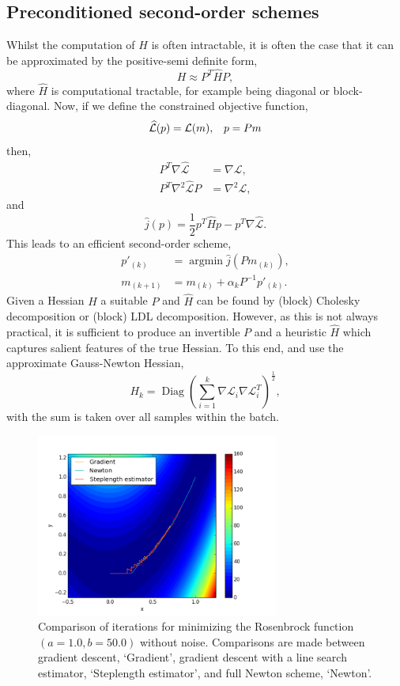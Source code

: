\documentclass[11pt,twocolumn]{article}
\DeclareMathOperator*{\Diag}{Diag}
\DeclareMathOperator*{\argmin}{argmin}
\begin{document}
\subsection{Preconditioned second-order schemes}
Whilst the computation of $H$ is often intractable, it is often the case that it can be approximated by the positive-semi definite form,
\begin{equation}
H \approx P^T \widehat{H} P,
\end{equation}
where $\widehat{H}$ is computational tractable, for example being diagonal or block-diagonal.  Now, if we define the constrained objective function,
\begin{equation}
\widehat{\mathcal{L}}(p)=\mathcal{L}(m), \hspace{0,3cm} p=Pm
\end{equation}
then,
\begin{align}
P^T \nabla \widehat{\mathcal{L}}&=\nabla \mathcal{L},\\
P^T \nabla^2 \widehat{\mathcal{L}} P&=\nabla^2 \mathcal{L},
\end{align}
and
\begin{equation}
\widehat{j}(p)=\frac{1}{2}p^T \widehat{H} p-p^T\nabla\widehat{\mathcal{L}}.
\end{equation} 
This leads to an efficient second-order scheme, 
\begin{align}
p'_{(k)}&=\argmin{\widehat{j}(P m_{(k)})},\\
m_{(k+1)}&=m_{(k)}+\alpha_{k}P^{-1} p'_{(k)}.
\end{align}
Given a Hessian $H$ a suitable $P$ and $\widehat{H}$ can be found by (block) Cholesky decomposition or (block) LDL decomposition. However, as this is not always practical, it is sufficient to produce an invertible $P$ and a heuristic $\widehat{H}$ which captures salient features of the true Hessian. To this end, \citet{Asi:BetterStoch} and \citet{Martens:Deep} use the approximate Gauss-Newton Hessian,
\begin{equation}
H_k=\Diag{\left(\sum_{i=1}^k \nabla \mathcal{L}_i \nabla \mathcal{L}_i ^T\right)^{\frac{1}{2}}},
\end{equation}
with the sum is taken over all samples within the batch.
\begin{figure}[!ht]
\centering
\includegraphics[height=6cm, width=8cm]{../src-rosen/Rosenbrock_iterations.png}
\caption{Comparison of iterations for minimizing the Rosenbrock function $(a=1.0, b=50.0)$ without noise. Comparisons are made between gradient descent, `Gradient', gradient descent with a line search estimator, `Steplength estimator', and full Newton scheme, `Newton'.}\label{Rosenbrock_iter1}
\end{figure}
\end{document}
